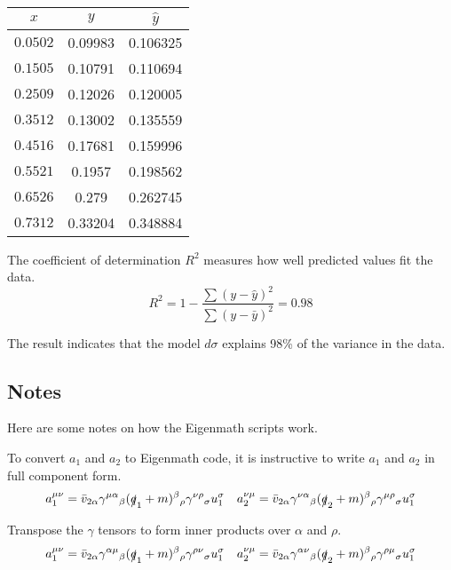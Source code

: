 \documentclass[12pt]{article}
\begin{document}
\begin{center}
\begin{tabular}{|c|c|c|}
\hline
$x$ & $y$ & $\hat{y}$\\
\hline
$0.0502$ & 0.09983 & 0.106325\\
$0.1505$ & 0.10791 & 0.110694\\
$0.2509$ & 0.12026 & 0.120005\\
$0.3512$ & 0.13002 & 0.135559\\
$0.4516$ & 0.17681 & 0.159996\\
$0.5521$ & 0.1957\phantom{0} & 0.198562\\
$0.6526$ & 0.279\phantom{00} & 0.262745\\
$0.7312$ & 0.33204 & 0.348884\\
\hline
\end{tabular}
\end{center}

The coefficient of determination $R^2$ measures how well predicted values fit the data.
\begin{equation*}
R^2=1-\frac{\sum(y-\hat{y})^2}{\sum(y-\bar{y})^2}=0.98
\end{equation*}

The result indicates that the model $d\sigma$ explains 98\% of the variance in the data.

\subsection*{Notes}
Here are some notes on how the Eigenmath scripts work.

\bigskip
To convert $a_1$ and $a_2$ to Eigenmath code,
it is instructive to write $a_1$ and $a_2$ in full component form.
\begin{equation*}
a_1^{\mu\nu}
=\bar{v}_{2\alpha}\gamma^{\mu\alpha}{}_\beta(\slashed{q}_1+m)^\beta{}_\rho\gamma^{\nu\rho}{}_\sigma u_1^\sigma
\quad
a_2^{\nu\mu}
=\bar{v}_{2\alpha}\gamma^{\nu\alpha}{}_\beta(\slashed{q}_2+m)^\beta{}_\rho\gamma^{\mu\rho}{}_\sigma u_1^\sigma
\end{equation*}

Transpose the $\gamma$ tensors to form inner products over $\alpha$ and $\rho$.
\begin{equation*}
a_1^{\mu\nu}
=\bar{v}_{2\alpha}\gamma^{\alpha\mu}{}_\beta(\slashed{q}_1+m)^\beta{}_\rho\gamma^{\rho\nu}{}_\sigma u_1^\sigma
\quad
a_2^{\nu\mu}
=\bar{v}_{2\alpha}\gamma^{\alpha\nu}{}_\beta(\slashed{q}_2+m)^\beta{}_\rho\gamma^{\rho\mu}{}_\sigma u_1^\sigma
\end{equation*}
\end{document}
